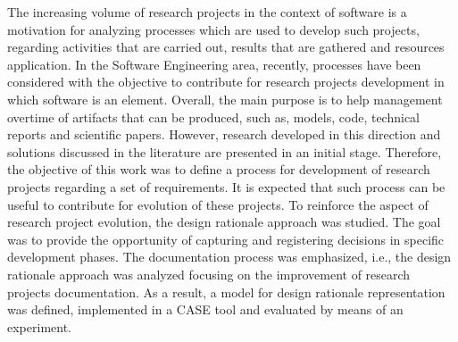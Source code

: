 The increasing volume of research projects in the context of software is a motivation for analyzing processes which are used to develop such projects, regarding activities that are carried out, results that are gathered and resources application. In the Software Engineering area, recently, processes have been considered with the objective to contribute for research projects development in which software is an element. Overall, the main purpose is to help management overtime of artifacts that can be produced, such as, models, code, technical reports and scientific papers. 
However, research developed in this direction and solutions discussed in the literature are presented in an initial stage. Therefore, the objective of this work was to define a process for development of research projects regarding a set of requirements. It is expected that such process can be useful to contribute for evolution of these projects. To reinforce the aspect of research project evolution, the design rationale approach was studied. The goal was to provide the opportunity of capturing and registering decisions in specific development phases. The documentation process was emphasized, i.e., the design rationale approach was analyzed focusing on the improvement of research projects documentation. As a result, a model for design rationale representation was defined, implemented in a CASE tool and evaluated by means of an experiment.
    



 